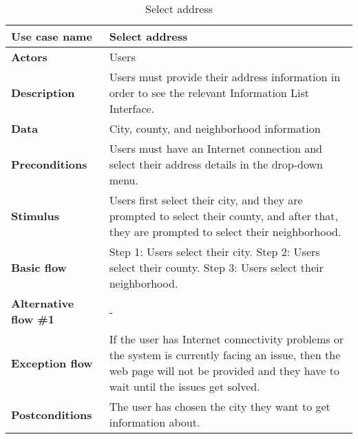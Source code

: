 \documentclass[listof=nochaptergap]{report}
\begin{document}
    \begin{table}[H]
        \centering
         \begin{tabular}{| p{4cm} | p{10cm} |} 
         \hline
         \textbf{Use case name} & Select address \\
         \hline
         \textbf{Actors} & Users \\
         \hline
         \textbf{Description} & Users must provide their address information in order to see the relevant Information List Interface. \\
         \hline
         \textbf{Data} & City, county, and neighborhood information \\
         \hline
         \textbf{Preconditions} & Users must have an Internet connection and select their address details in the drop-down menu. \\
         \hline
         \textbf{Stimulus} & Users first select their city, and they are prompted to select their county, and after that, they are prompted to select their neighborhood. \\
         \hline
         \textbf{Basic flow} & Step 1: Users select their city. \newline Step 2: Users select their county. \newline Step 3: Users select their neighborhood. \\
         \hline
         \textbf{Alternative flow \#1} & - \\
         \hline
         \textbf{Exception flow} & If the user has Internet connectivity problems or the system is currently facing an issue, then the web page will not be provided and they have to wait until the issues get solved. \\
         \hline
         \textbf{Postconditions} & The user has chosen the city they want to get information about. \\
         \hline
         \end{tabular}
        \caption{Select address}
        \label{tab:table11}
    \end{table}
\end{document}
